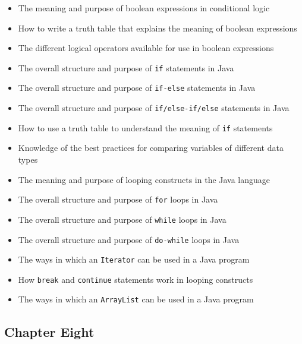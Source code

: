 \begin{itemize}

  \itemsep -.015in
  \item The meaning and purpose of boolean expressions in conditional logic
  \item How to write a truth table that explains the meaning of boolean expressions
  \item The different logical operators available for use in boolean expressions
  \item The overall structure and purpose of {\tt if} statements in Java
  \item The overall structure and purpose of {\tt if-else} statements in Java
  \item The overall structure and purpose of {\tt if/else-if/else} statements in Java
  \item How to use a truth table to understand the meaning of {\tt if} statements
  \item Knowledge of the best practices for comparing variables of different data types
  \item The meaning and purpose of looping constructs in the Java language
  \item The overall structure and purpose of {\tt for} loops in Java
  \item The overall structure and purpose of {\tt while} loops in Java
  \item The overall structure and purpose of {\tt do-while} loops in Java
  \item The ways in which an {\tt Iterator} can be used in a Java program
  \item How {\tt break} and {\tt continue} statements work in looping constructs
  \item The ways in which an {\tt ArrayList} can be used in a Java program

\end{itemize}

\vspace*{-.2in}
\subsection*{Chapter Eight}
\vspace*{-.05in}

